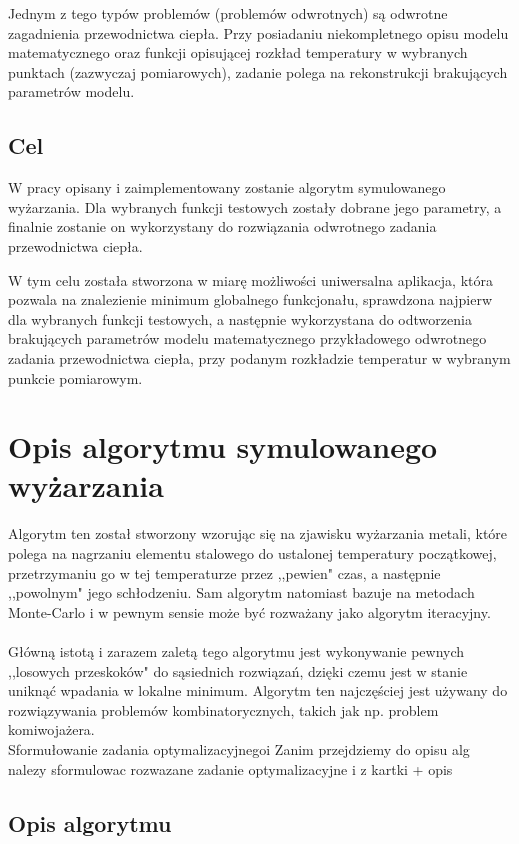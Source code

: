 \documentclass[twoside]{projektInzynierskiMS1}
\newcommand{\newLine}{~\\}
\newcommand{\si}{ś}
\begin{document}
Jednym z tego typów problemów (problemów odwrotnych) są odwrotne zagadnienia przewodnictwa ciepła. Przy posiadaniu niekompletnego opisu modelu matematycznego oraz funkcji opisującej rozkład temperatury w wybranych punktach (zazwyczaj pomiarowych), zadanie polega na rekonstrukcji brakujących parametrów modelu. 

\subsection{Cel}

W pracy opisany i zaimplementowany zostanie algorytm symulowanego wyżarzania. Dla wybranych funkcji testowych zostały dobrane jego parametry, a finalnie zostanie on wykorzystany do rozwiązania odwrotnego zadania przewodnictwa ciepła.

W tym celu została stworzona w miarę możliwo\si ci uniwersalna aplikacja, która pozwala na znalezienie minimum globalnego funkcjonału, sprawdzona najpierw dla wybranych funkcji testowych, a następnie wykorzystana do odtworzenia brakujących parametrów modelu matematycznego przykładowego odwrotnego zadania przewodnictwa ciepła, przy podanym rozkładzie temperatur w wybranym punkcie pomiarowym.


\section{Opis algorytmu symulowanego wyżarzania}
				Algorytm ten został stworzony wzorując się na zjawisku wyżarzania metali, które polega na nagrzaniu elementu stalowego do ustalonej temperatury początkowej, przetrzymaniu go w tej temperaturze przez ,,pewien" czas, a następnie ,,powolnym" jego schłodzeniu. Sam algorytm natomiast bazuje na metodach Monte-Carlo i w pewnym sensie może być rozważany jako algorytm iteracyjny.\\ \newLine
Główną istotą i zarazem zaletą tego algorytmu jest wykonywanie pewnych ,,losowych przeskoków" do sąsiednich rozwiązań, dzięki czemu jest w stanie uniknąć wpadania w lokalne minimum. Algorytm ten najczę\si ciej jest używany do rozwiązywania problemów kombinatorycznych, takich jak np. problem komiwojażera. \\

Sformułowanie zadania optymalizacyjnegoi
Zanim przejdziemy do opisu alg  nalezy sformulowac rozwazane zadanie optymalizacyjne
i z kartki + opis

		\subsection{Opis algorytmu}
		
\end{document}
